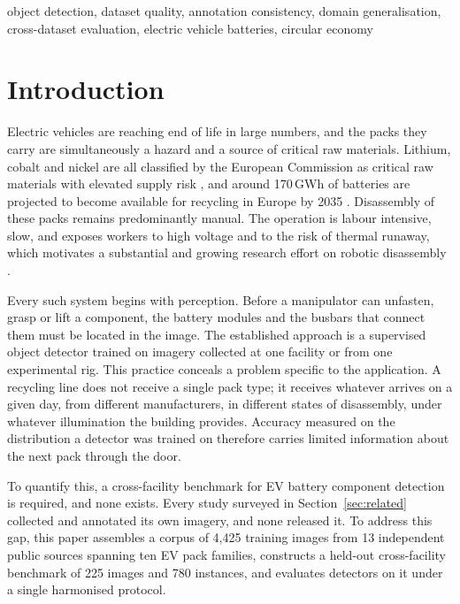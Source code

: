 \documentclass[conference]{IEEEtran}
\begin{document}
\begin{IEEEkeywords}
object detection, dataset quality, annotation consistency, domain generalisation,
cross-dataset evaluation, electric vehicle batteries, circular economy
\end{IEEEkeywords}

\section{Introduction}

Electric vehicles are reaching end of life in large numbers, and the packs they
carry are simultaneously a hazard and a source of critical raw materials. Lithium,
cobalt and nickel are all classified by the European Commission as critical raw
materials with elevated supply risk \cite{ec_crm,harper2019}, and around
170\,GWh of batteries are projected to become available for recycling in Europe by
2035 \cite{te2024}.
Disassembly of these packs remains predominantly manual. The operation is
labour intensive, slow, and exposes workers to high voltage and to the risk of
thermal runaway, which motivates a substantial and growing research effort on
robotic disassembly \cite{zang2024robotic,tan2025screws}.

Every such system begins with perception. Before a manipulator can unfasten,
grasp or lift a component, the battery modules and the busbars that connect them
must be located in the image. The established approach is a supervised object
detector trained on imagery collected at one facility or from one experimental
rig. This practice conceals a problem specific to the application. A recycling
line does not receive a single pack type; it receives whatever arrives on a given
day, from different manufacturers, in different states of disassembly, under
whatever illumination the building provides. Accuracy measured on the
distribution a detector was trained on therefore carries limited information
about the next pack through the door.

To quantify this, a cross-facility benchmark for EV battery component detection
is required, and none exists. Every study surveyed in
Section~\ref{sec:related} collected and annotated its own imagery, and none
released it. To address this gap, this paper assembles a corpus of 4,425
training images from 13 independent public sources spanning ten EV pack families,
constructs a held-out cross-facility benchmark of 225 images and 780 instances,
and evaluates detectors on it under a single harmonised protocol.
\end{document}

